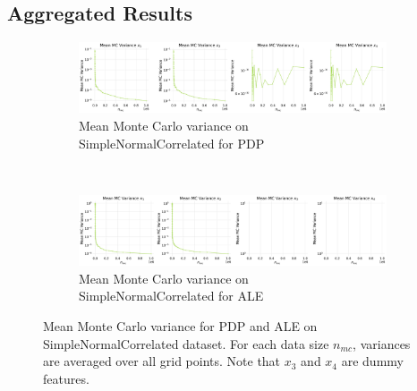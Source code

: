 \documentclass[runningheads]{llncs}
\begin{document}
\subsection{Aggregated Results}

\begin{figure}[h!]
    \centering
    \begin{subfigure}[b]{\textwidth}
        \centering
        \includegraphics[width=\textwidth]{img/SNC-all/mean_mc_variance_pdp.png}
        \caption{Mean Monte Carlo variance on SimpleNormalCorrelated for PDP}
    \end{subfigure}
    \\[10pt]
    \vfill
    \begin{subfigure}[b]{\textwidth}
        \centering
        \includegraphics[width=\textwidth]{img/SNC-all/mean_mc_variance_ale.png}
        \caption{Mean Monte Carlo variance on SimpleNormalCorrelated for ALE}
    \end{subfigure}
    \caption{Mean Monte Carlo variance for PDP and ALE on SimpleNormalCorrelated dataset.
        For each data size $n_{mc}$, variances are averaged over all grid points.
        Note that $x_3$ and $x_4$ are dummy features.}
    \label{fig:mean-mc-variance-snc}  %
\end{figure}
\end{document}
